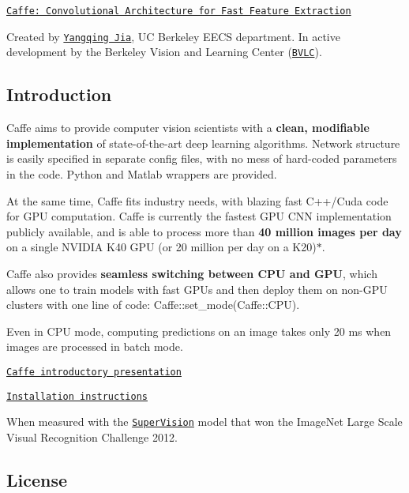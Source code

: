 \href{http://caffe.berkeleyvision.org}{\tt Caffe\+: Convolutional Architecture for Fast Feature Extraction}

Created by \href{http://daggerfs.com}{\tt Yangqing Jia}, U\+C Berkeley E\+E\+C\+S department. In active development by the Berkeley Vision and Learning Center (\href{http://bvlc.eecs.berkeley.edu/}{\tt B\+V\+L\+C}).

\subsection*{Introduction}

Caffe aims to provide computer vision scientists with a {\bfseries clean, modifiable implementation} of state-\/of-\/the-\/art deep learning algorithms. Network structure is easily specified in separate config files, with no mess of hard-\/coded parameters in the code. Python and Matlab wrappers are provided.

At the same time, Caffe fits industry needs, with blazing fast C++/\+Cuda code for G\+P\+U computation. Caffe is currently the fastest G\+P\+U C\+N\+N implementation publicly available, and is able to process more than {\bfseries 40 million images per day} on a single N\+V\+I\+D\+I\+A K40 G\+P\+U (or 20 million per day on a K20)$\ast$.

Caffe also provides {\bfseries seamless switching between C\+P\+U and G\+P\+U}, which allows one to train models with fast G\+P\+Us and then deploy them on non-\/\+G\+P\+U clusters with one line of code\+: {\ttfamily Caffe\+::set\+\_\+mode(\+Caffe\+::\+C\+P\+U)}.

Even in C\+P\+U mode, computing predictions on an image takes only 20 ms when images are processed in batch mode.


\begin{DoxyItemize}
\item \href{https://www.dropbox.com/s/10fx16yp5etb8dv/caffe-presentation.pdf}{\tt Caffe introductory presentation}
\item \href{http://caffe.berkeleyvision.org/installation.html}{\tt Installation instructions}
\item When measured with the \href{http://www.image-net.org/challenges/LSVRC/2012/supervision.pdf}{\tt Super\+Vision} model that won the Image\+Net Large Scale Visual Recognition Challenge 2012.
\end{DoxyItemize}

\subsection*{License}

